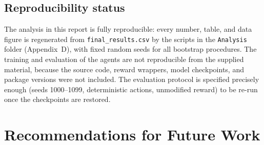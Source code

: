 \documentclass[11pt,a4paper]{article}
\begin{document}
\subsection{Reproducibility status}

The analysis in this report is fully reproducible: every number, table, and data figure is regenerated from \texttt{final\_results.csv} by the scripts in the \texttt{Analysis} folder (Appendix~D), with fixed random seeds for all bootstrap procedures. The training and evaluation of the agents are not reproducible from the supplied material, because the source code, reward wrappers, model checkpoints, and package versions were not included. The evaluation protocol is specified precisely enough (seeds 1000--1099, deterministic actions, unmodified reward) to be re-run once the checkpoints are restored.

\section{Recommendations for Future Work}\label{sec:future}
\end{document}
